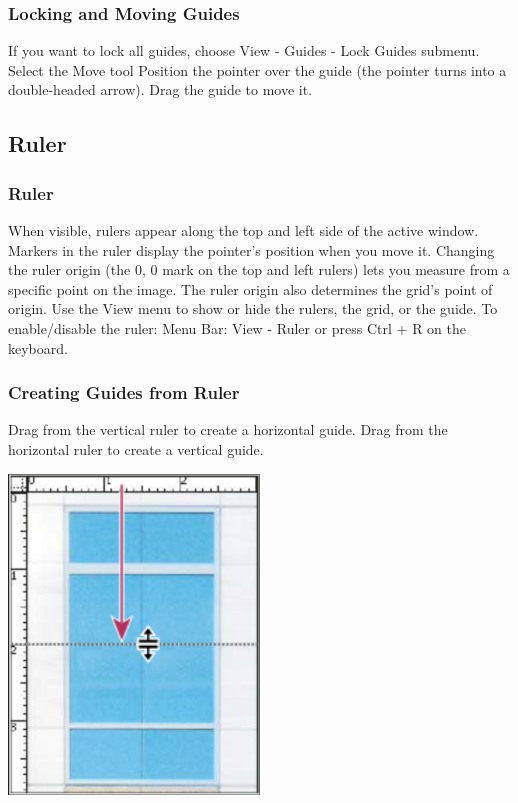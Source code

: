 \documentclass{beamer}
\begin{document}
	\begin{frame}
	\frametitle{Locking and Moving Guides}
	\begin{outline}
		\1 If you want to lock all guides, choose View - Guides - Lock Guides submenu.
		\1 Select the Move tool
		\2 Position the pointer over the guide (the pointer turns into a double-headed arrow).
		\2 Drag the guide to move it.
	\end{outline}
\end{frame}

	\subsection{Ruler}
	\begin{frame}
	\frametitle{Ruler}
	\begin{outline}
		\1 When visible, rulers appear along the top and left side of the active window. 
		\1 Markers in the ruler display the pointer’s position when you move it.
		\1 Changing the ruler origin (the 0, 0 mark on the top and left rulers) lets you measure from a specific point on the image.
		\1 The ruler origin also determines the grid’s point of origin.
		\1 Use the View menu to show or hide the rulers, the grid, or the guide.
		\1 To enable/disable the ruler:
		\2 Menu Bar:  View - Ruler
		\2 or press Ctrl + R on the keyboard.
	\end{outline}
\end{frame}



	\begin{frame}
	\frametitle{Creating Guides from Ruler}
	\begin{outline}
		\1 Drag from the vertical ruler to create a horizontal guide.
		\1 Drag from the horizontal ruler to create a vertical guide.
	\end{outline}
		\begin{center}
	\includegraphics[width = 0.5\textwidth]{images/guides 2.png}
\end{center}
\end{frame}
\end{document}
